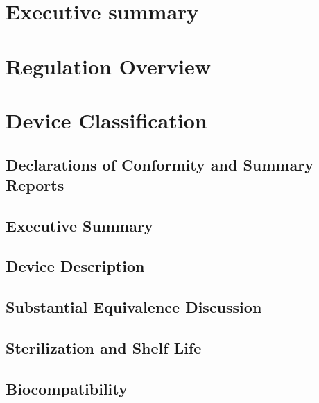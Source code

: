 \documentclass{article}
\begin{document}

\setcounter{tocdepth}{3}
\tableofcontents
\newpage

\section*{Executive summary}
\label{sec:exec-summary}

\section{Regulation Overview}
\label{sec:test-administration}

\section{Device Classification}
\label{sec:protocols}





\setcounter{subsection}{0}





\subsection{Declarations of Conformity and Summary Reports}
\subsection{Executive Summary}
\subsection{Device Description}
\subsection{Substantial Equivalence Discussion}



\subsection{Sterilization and Shelf Life}
\subsection{Biocompatibility}
\end{document}
